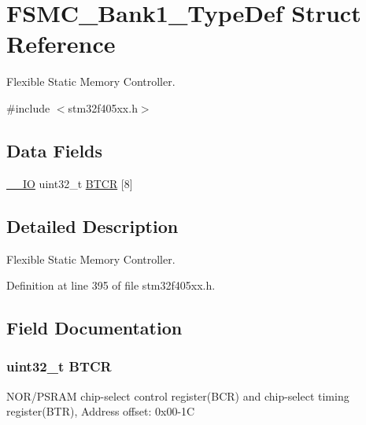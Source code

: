 \hypertarget{struct_f_s_m_c___bank1___type_def}{}\section{F\+S\+M\+C\+\_\+\+Bank1\+\_\+\+Type\+Def Struct Reference}
\label{struct_f_s_m_c___bank1___type_def}


Flexible Static Memory Controller.  




{\ttfamily \#include $<$stm32f405xx.\+h$>$}

\subsection*{Data Fields}
\begin{DoxyCompactItemize}
\item 
\hyperlink{core__sc300_8h_aec43007d9998a0a0e01faede4133d6be}{\+\_\+\+\_\+\+IO} uint32\+\_\+t \hyperlink{struct_f_s_m_c___bank1___type_def_a83f08fda3308bcc19ca81237248e5f6a}{B\+T\+CR} \mbox{[}8\mbox{]}
\end{DoxyCompactItemize}


\subsection{Detailed Description}
Flexible Static Memory Controller. 

Definition at line 395 of file stm32f405xx.\+h.



\subsection{Field Documentation}
\subsubsection[{\texorpdfstring{B\+T\+CR}{BTCR}}]{ uint32\+\_\+t B\+T\+CR}\hypertarget{struct_f_s_m_c___bank1___type_def_a83f08fda3308bcc19ca81237248e5f6a}{}\label{struct_f_s_m_c___bank1___type_def_a83f08fda3308bcc19ca81237248e5f6a}
N\+O\+R/\+P\+S\+R\+AM chip-\/select control register(\+B\+C\+R) and chip-\/select timing register(\+B\+T\+R), Address offset\+: 0x00-\/1C 

